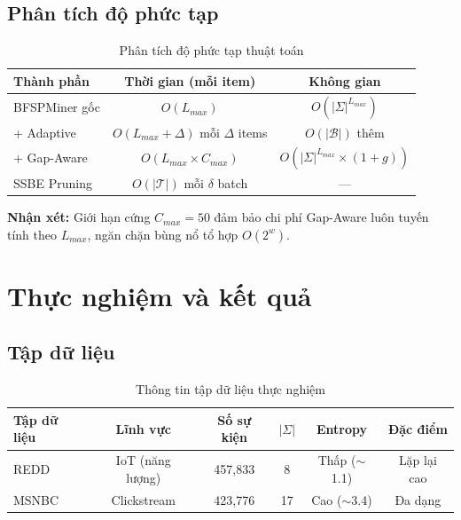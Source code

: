 \documentclass[14pt,a4paper,oneside]{extreport}
\begin{document}
\section{Phân tích độ phức tạp}

\begin{table}[H]
    \centering
    \caption{Phân tích độ phức tạp thuật toán}
    \label{tab:complexity}
    \begin{tabular}{lcc}
        \toprule
        \textbf{Thành phần} & \textbf{Thời gian (mỗi item)} & \textbf{Không gian} \\
        \midrule
        BFSPMiner gốc      & $O(L_{max})$                    & $O(|\Sigma|^{L_{max}})$ \\
        + Adaptive          & $O(L_{max} + \Delta)$ mỗi $\Delta$ items & $O(|\mathcal{B}|)$ thêm \\
        + Gap-Aware         & $O(L_{max} \times C_{max})$     & $O(|\Sigma|^{L_{max}} \times (1+g))$ \\
        SSBE Pruning        & $O(|\mathcal{T}|)$ mỗi $\delta$ batch & --- \\
        \bottomrule
    \end{tabular}
\end{table}

\textbf{Nhận xét:} Giới hạn cứng $C_{max} = 50$ đảm bảo chi phí Gap-Aware luôn tuyến tính theo $L_{max}$, ngăn chặn bùng nổ tổ hợp $O(2^w)$.

\chapter{Thực nghiệm và kết quả}
\label{chap:experiments}

\section{Tập dữ liệu}

\begin{table}[H]
    \centering
    \caption{Thông tin tập dữ liệu thực nghiệm}
    \label{tab:datasets}
    \begin{tabular}{lccccc}
        \toprule
        \textbf{Tập dữ liệu} & \textbf{Lĩnh vực} & \textbf{Số sự kiện} & \textbf{$|\Sigma|$} & \textbf{Entropy} & \textbf{Đặc điểm} \\
        \midrule
        REDD \cite{kolter2011} & IoT (năng lượng) & 457,833 & 8  & Thấp ($\sim$1.1) & Lặp lại cao \\
        MSNBC \cite{msnbc2000} & Clickstream      & 423,776 & 17 & Cao ($\sim$3.4)  & Đa dạng \\
        \bottomrule
    \end{tabular}
\end{table}
\end{document}

